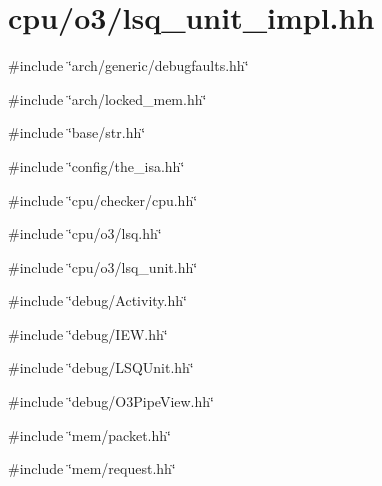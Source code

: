 \hypertarget{o3_2lsq__unit__impl_8hh}{
\section{cpu/o3/lsq\_\-unit\_\-impl.hh}
\label{o3_2lsq__unit__impl_8hh}
}
{\ttfamily \#include \char`\"{}arch/generic/debugfaults.hh\char`\"{}}\par
{\ttfamily \#include \char`\"{}arch/locked\_\-mem.hh\char`\"{}}\par
{\ttfamily \#include \char`\"{}base/str.hh\char`\"{}}\par
{\ttfamily \#include \char`\"{}config/the\_\-isa.hh\char`\"{}}\par
{\ttfamily \#include \char`\"{}cpu/checker/cpu.hh\char`\"{}}\par
{\ttfamily \#include \char`\"{}cpu/o3/lsq.hh\char`\"{}}\par
{\ttfamily \#include \char`\"{}cpu/o3/lsq\_\-unit.hh\char`\"{}}\par
{\ttfamily \#include \char`\"{}debug/Activity.hh\char`\"{}}\par
{\ttfamily \#include \char`\"{}debug/IEW.hh\char`\"{}}\par
{\ttfamily \#include \char`\"{}debug/LSQUnit.hh\char`\"{}}\par
{\ttfamily \#include \char`\"{}debug/O3PipeView.hh\char`\"{}}\par
{\ttfamily \#include \char`\"{}mem/packet.hh\char`\"{}}\par
{\ttfamily \#include \char`\"{}mem/request.hh\char`\"{}}\par
